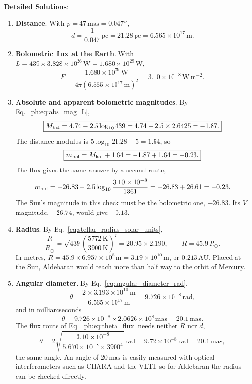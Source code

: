 \textbf{Detailed Solutions}:
\begin{enumerate}[label=(\alph*)]
	\item \textbf{Distance}. With $p = 47\,\mathrm{mas} = 0.047''$,
	\[
	\boxed{d = \frac{1}{0.047}\,\mathrm{pc} = 21.28\,\mathrm{pc} = 6.565 \times 10^{17}\,\mathrm{m}.}
	\]

	\item \textbf{Bolometric flux at the Earth}. With $L = 439 \times 3.828 \times 10^{26}\,\mathrm{W} = 1.680 \times 10^{29}\,\mathrm{W}$,
	\[
	\boxed{F = \frac{1.680 \times 10^{29}\,\mathrm{W}}{4\pi \left(6.565 \times 10^{17}\,\mathrm{m}\right)^2} = 3.10 \times 10^{-8}\,\mathrm{W\,m^{-2}}.}
	\]

	\item \textbf{Absolute and apparent bolometric magnitudes}. By Eq.~\eqref{ph:eq:abs_mag_L},
	\[
	\boxed{M_{\rm bol} = 4.74 - 2.5\log_{10}439 = 4.74 - 2.5\times2.6425 = -1.87.}
	\]
	The distance modulus is $5\log_{10}21.28 - 5 = 1.64$, so
	\[
	\boxed{m_{\rm bol} = M_{\rm bol} + 1.64 = -1.87 + 1.64 = -0.23.}
	\]
	The flux gives the same answer by a second route,
	\[
	m_{\rm bol} = -26.83 - 2.5\log_{10}\frac{3.10 \times 10^{-8}}{1361} = -26.83 + 26.61 = -0.23 .
	\]
	The Sun's magnitude in this check must be the bolometric one, $-26.83$. Its $V$ magnitude, $-26.74$, would give $-0.13$.

	\item \textbf{Radius}. By Eq.~\eqref{eq:stellar_radius_solar_units},
	\[
	\frac{R}{R_\odot} = \sqrt{439}\left(\frac{5772\,\mathrm{K}}{3900\,\mathrm{K}}\right)^2 = 20.95 \times 2.190 ,\qquad \boxed{R=45.9\,R_\odot.}
	\]
	In metres, $R = 45.9 \times 6.957 \times 10^8\,\mathrm{m} = 3.19 \times 10^{10}\,\mathrm{m}$, or $0.213\,\mathrm{AU}$. Placed at the Sun, Aldebaran would reach more than half way to the orbit of Mercury.

	\item \textbf{Angular diameter}. By Eq.~\eqref{eq:angular_diameter_rad},
	\[
	\theta = \frac{2 \times 3.193 \times 10^{10}\,\mathrm{m}}{6.565 \times 10^{17}\,\mathrm{m}} = 9.726 \times 10^{-8}\,\mathrm{rad},
	\]
	and in milliarcseconds
	\[
	\boxed{\theta = 9.726 \times 10^{-8} \times 2.0626\times10^8\,\mathrm{mas} = 20.1\,\mathrm{mas}.}
	\]
	The flux route of Eq.~\eqref{ph:eq:theta_flux} needs neither $R$ nor $d$,
	\[
	\theta=2\sqrt{\frac{3.10\times10^{-8}}{5.670\times10^{-8}\times3900^4}}\,\mathrm{rad}=9.72\times10^{-8}\,\mathrm{rad}=20.1\,\mathrm{mas},
	\]
	the same angle. An angle of $20\,\mathrm{mas}$ is easily measured with optical interferometers such as CHARA and the VLTI, so for Aldebaran the radius can be checked directly.
\end{enumerate}

